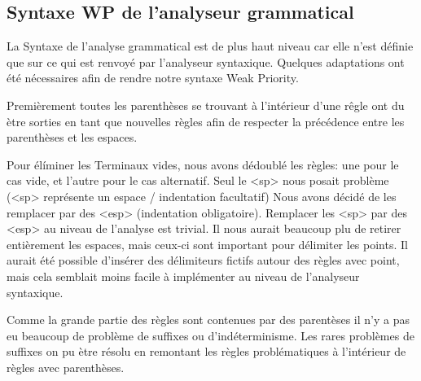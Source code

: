 \subsection{Syntaxe WP de l'analyseur grammatical}
La Syntaxe de l'analyse grammatical est de plus haut niveau car elle n'est définie que sur ce qui
est renvoyé par l'analyseur syntaxique. Quelques adaptations ont été nécessaires afin de rendre
notre syntaxe Weak Priority. 

Premièrement toutes les parenthèses se trouvant à l'intérieur d'une rêgle ont du ètre sorties en
tant que nouvelles règles afin de respecter la précédence entre les parenthèses et les espaces.  

Pour élíminer les Terminaux vides, nous avons dédoublé les règles: une pour le cas vide, et l'autre
pour le cas alternatif. Seul le <sp> nous posait problème (<sp> représente un espace / indentation facultatif)
Nous avons décidé de les remplacer par des <esp> (indentation obligatoire). Remplacer les <sp> par des <esp> au
niveau de l'analyse est trivial. Il nous aurait beaucoup plu de retirer entièrement les espaces, mais ceux-ci
sont important pour délimiter les points. Il aurait été possible d'insérer des délimiteurs fictifs autour
des règles avec point, mais cela semblait moins facile à implémenter au niveau de l'analyseur syntaxique. 

Comme la grande partie des règles sont contenues par des parentèses il n'y a pas eu beaucoup de problème de suffixes
ou d'indéterminisme. Les rares problèmes de suffixes on pu ètre résolu en remontant les règles problématiques
à l'intérieur de règles avec parenthèses. 

